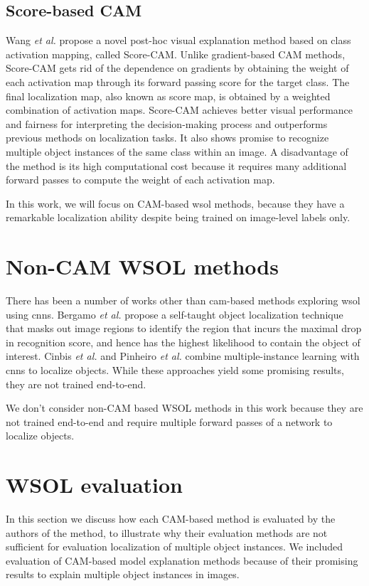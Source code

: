 \subsection{Score-based CAM}
Wang \textit{et al.} \cite{wang2020score} propose a novel post-hoc visual explanation method based on class activation mapping, called Score-CAM. Unlike gradient-based CAM methods, Score-CAM gets rid of the dependence on gradients by obtaining the weight of each activation map through its forward passing score for the target class. The final localization map, also known as score map, is obtained by a weighted combination of activation maps. Score-CAM achieves better visual performance and fairness for interpreting the decision-making process and outperforms previous methods on localization tasks. It also shows promise to recognize multiple object instances of the same class within an image. A disadvantage of the method is its high computational cost because it requires many additional forward passes to compute the weight of each activation map.

In this work, we will focus on CAM-based \acrshort{wsol} methods, because they have a remarkable localization ability despite being trained on image-level labels only.

\section{Non-CAM WSOL methods}
There has been a number of works other than \acrshort{cam}-based methods exploring \acrfull{wsol} using \acrshort{cnn}s. Bergamo \textit{et al.} \cite{bazzani2016self} propose a self-taught object localization technique that masks out image regions to identify the region that incurs the maximal drop in recognition score, and hence has the highest likelihood to contain the object of interest. Cinbis \textit{et al.} \cite{cinbis2016weakly} and Pinheiro \textit{et al.} \cite{pinheiro2015image} combine multiple-instance learning with \acrshort{cnn}s to localize objects. While these approaches yield some promising results, they are not trained end-to-end.

We don't consider non-CAM based WSOL methods in this work because they are not trained end-to-end and require multiple forward passes of a network to localize objects.

\section{WSOL evaluation}
In this section we discuss how each CAM-based method is evaluated by the authors of the method, to illustrate why their evaluation methods are not sufficient for evaluation localization of multiple object instances. We included evaluation of CAM-based model explanation methods because of their promising results to explain multiple object instances in images.

